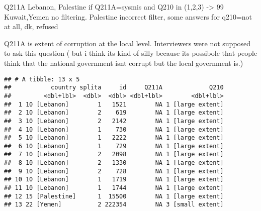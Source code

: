 \documentclass[]{article}
\begin{document}
Q211A Lebanon, Palestine if Q211A=sysmis and Q210 in (1,2,3)
-\textgreater{} 99 Kuwait,Yemen no filtering. Palestine incorrect
filter, some answers for q210=not at all, dk, refused

Q211A is extent of corruption at the local level. Interviewers were not
supposed to ask this question ( but i think its kind of silly because
its possibole that people think that the national government isnt
corrupt but the local government is.)

\begin{verbatim}
## # A tibble: 13 x 5
##           country splita     id     Q211A             Q210
##         <dbl+lbl>  <dbl>  <dbl> <dbl+lbl>        <dbl+lbl>
##  1 10 [Lebanon]        1   1521        NA 1 [large extent]
##  2 10 [Lebanon]        2    619        NA 1 [large extent]
##  3 10 [Lebanon]        2   2142        NA 1 [large extent]
##  4 10 [Lebanon]        1    730        NA 1 [large extent]
##  5 10 [Lebanon]        1   2222        NA 1 [large extent]
##  6 10 [Lebanon]        1    729        NA 1 [large extent]
##  7 10 [Lebanon]        2   2098        NA 1 [large extent]
##  8 10 [Lebanon]        2   1330        NA 1 [large extent]
##  9 10 [Lebanon]        2    728        NA 1 [large extent]
## 10 10 [Lebanon]        1   1719        NA 1 [large extent]
## 11 10 [Lebanon]        1   1744        NA 1 [large extent]
## 12 15 [Palestine]      1  15500        NA 1 [large extent]
## 13 22 [Yemen]          2 222354        NA 3 [small extent]
\end{verbatim}
\end{document}
